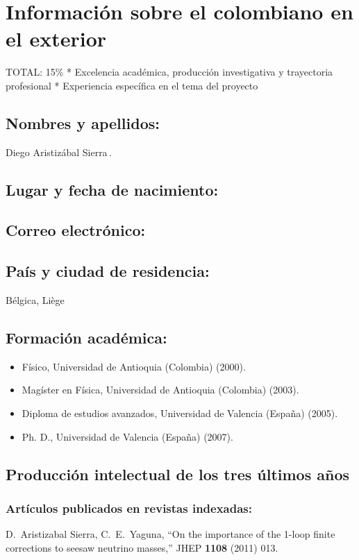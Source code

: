 \section{Información sobre el colombiano en el exterior}
\begin{evaluacion}
  TOTAL: 15\%
  * Excelencia académica, producción investigativa y trayectoria profesional
  * Experiencia específica en el tema del proyecto
\end{evaluacion}
\subsection{Nombres y apellidos:}
Diego Aristizábal Sierra\,.
\subsection{Lugar y fecha de nacimiento:}
\fnaristizabal
\subsection{Correo electrónico:}
\emaristizabal
\subsection{País y ciudad de residencia:}
Bélgica, Liège
\subsection{Formación académica:}
\begin{itemize}
\item Físico, Universidad de Antioquia (Colombia) (2000).
\item Magíster en Física, Universidad de Antioquia (Colombia) (2003).
\item Diploma de estudios avanzados, Universidad de Valencia (España) (2005).  
\item Ph. D., Universidad de Valencia (España) (2007).
\end{itemize}
\subsection{Producción intelectual de los tres últimos años}
\subsubsection{Artículos publicados en revistas indexadas:}
  D.~Aristizabal Sierra, C.~E.~Yaguna,
  ``On the importance of the 1-loop finite corrections to seesaw neutrino masses,''
  JHEP {\bf 1108 } (2011)  013.

